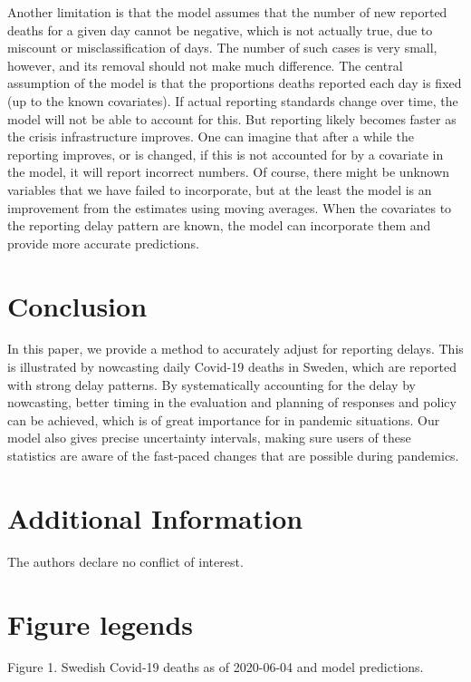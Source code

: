 \documentclass[a4paper,11pth]{article}
\begin{document}
Another limitation is that the model assumes that the number of new reported deaths for a given day cannot be negative, which is not actually true, due to miscount or misclassification of days. The number of such cases is very small, however, and its removal should not make much difference. The central assumption of the model is that the proportions deaths reported each day is fixed (up to the known covariates). If actual reporting standards change over time, the model will not be able to account for this. But reporting likely becomes faster as the crisis infrastructure improves. One can imagine that after a while the reporting improves, or is changed, if this is not accounted for by a covariate in the model, it will report incorrect numbers. Of course, there might be unknown variables that we have failed to incorporate, but at the least the model is an improvement from the estimates using moving averages. When the covariates to the reporting delay pattern are known, the model can incorporate them and provide more accurate predictions. 

\section{Conclusion}
In this paper, we provide a method to accurately adjust for reporting delays. This is illustrated by nowcasting daily Covid-19 deaths in Sweden, which are reported with strong delay patterns. By systematically accounting for the delay by nowcasting, better timing in the evaluation and planning of responses and policy can be achieved, which is of great importance for in pandemic situations. Our model also gives precise uncertainty intervals, making sure users of these statistics are aware of the fast-paced changes that are possible during pandemics.

\section{Additional Information}
The authors declare no conflict of interest.


\newpage



%

\newpage
\section{Figure legends}
Figure 1. Swedish Covid-19 deaths as of 2020-06-04 and model predictions.
\end{document}
